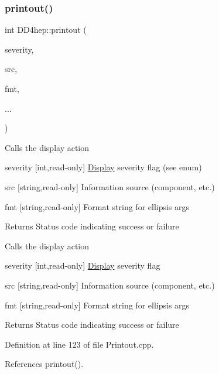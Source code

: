 \hypertarget{namespace_d_d4hep_a40471a3209c63eb0f25dcad8c5f0e3d6}{}\label{namespace_d_d4hep_a40471a3209c63eb0f25dcad8c5f0e3d6} 
\subsubsection{\texorpdfstring{printout()}{printout()}\hspace{0.1cm}{\footnotesize\ttfamily [4/8]}}
{\footnotesize\ttfamily int D\+D4hep\+::printout (\begin{DoxyParamCaption}\item[{\hyperlink{namespace_d_d4hep_a5b5a64d56252469451f2020a27d57d42}{Print\+Level}}]{severity,  }\item[{const char $\ast$}]{src,  }\item[{const std\+::string \&}]{fmt,  }\item[{}]{... }\end{DoxyParamCaption})}

Calls the display action \begin{DoxyItemize}
\item severity \mbox{[}int,read-\/only\mbox{]} \hyperlink{class_d_d4hep_1_1_display}{Display} severity flag (see enum) \item src \mbox{[}string,read-\/only\mbox{]} Information source (component, etc.) \item fmt \mbox{[}string,read-\/only\mbox{]} Format string for ellipsis args \begin{DoxyReturn}{Returns}
Status code indicating success or failure
\end{DoxyReturn}
Calls the display action \item severity \mbox{[}int,read-\/only\mbox{]} \hyperlink{class_d_d4hep_1_1_display}{Display} severity flag \item src \mbox{[}string,read-\/only\mbox{]} Information source (component, etc.) \item fmt \mbox{[}string,read-\/only\mbox{]} Format string for ellipsis args \begin{DoxyReturn}{Returns}
Status code indicating success or failure 
\end{DoxyReturn}
\end{DoxyItemize}


Definition at line 123 of file Printout.\+cpp.



References printout().


